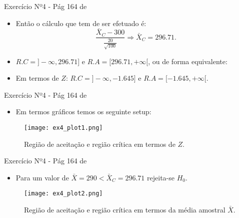 \documentclass[10,5pt, pdf]{beamer}
\begin{document}
\begin{frame}{Exercício Nº4 -  Pág 164 de \cite{reis2021}}
\begin{itemize}
    \item{Então o cálculo que tem de ser efetuado é:}
    \pause
    \begin{equation}
    \frac{\bar{X}_C - 300}{\frac{20}{\sqrt{100}}}\Longrightarrow \bar{X}_C=296.71.  
    \end{equation}
    \pause
    \item{$R.C=]-\infty, 296.71]$ e $R.A=[296.71, +\infty[$, ou de forma equivalente:}
    \pause
    \item{Em termos de $Z$: $R.C=]-\infty, -1.645]$ e $R.A=[-1.645, +\infty[$.}
\end{itemize}
\end{frame}

\begin{frame}{Exercício Nº4 -  Pág 164 de \cite{reis2021}}
\begin{itemize}
    \item{Em termos gráficos temos os seguinte setup:}
    \pause
\end{itemize}
\begin{figure}
    \centering
    \texttt{[image: ex4\_plot1.png]}
    \caption{Região de aceitação e região crítica em termos de $Z$.}
\end{figure}
\end{frame}

\begin{frame}{Exercício Nº4 -  Pág 164 de \cite{reis2021}}
\begin{itemize}
    \item{Para um valor de $\bar{X}=290<\bar{X}_C=296.71$ rejeita-se $H_0$.}
    \pause
\end{itemize}
\begin{figure}
    \centering
    \texttt{[image: ex4\_plot2.png]}
    \caption{Região de aceitação e região crítica em termos da média amostral $\bar{X}$.}
\end{figure}
\end{frame}
\end{document}
